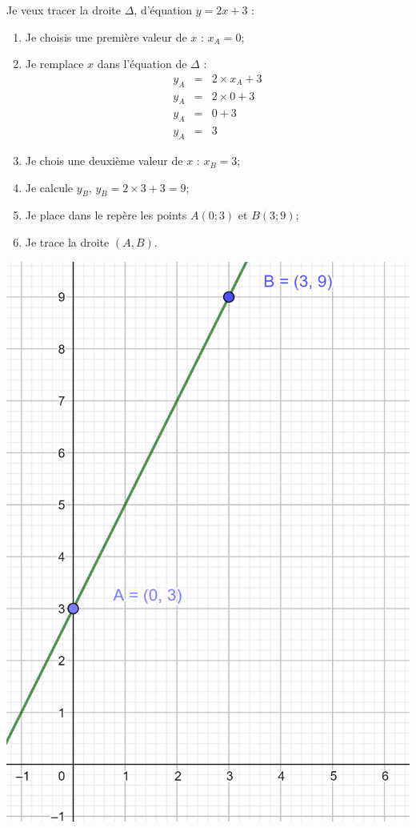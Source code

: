 \documentclass[12pt,a4paper]{article}
\begin{document}
Je veux tracer la droite $\Delta$, d'équation $ y = 2x + 3$ :
\begin{multicols}{2}
	
\begin{enumerate}
	\item Je choisis une première valeur de $x$ : $x_A = 0$;
	\item Je remplace $x$ dans l'équation de $\Delta$ :
		\begin{eqnarray*}
			y_A &=& 2 \times x_A + 3 \\
			y_A &=& 2 \times 0 + 3 \\
			y_A &=& 0 + 3 \\
			y_A &=& 3
		\end{eqnarray*} 
	\item Je chois une deuxième valeur de $x$ : $x_B = 3$;
	\item Je calcule $y_B$, $y_B = 2 \times 3 + 3 = 9$;
	\item Je place dans le repère les points $A(0;3)$ et $B(3;9)$;
	\item Je trace la droite $(A,B)$.
\end{enumerate}

\begin{center}
	\includegraphics[scale=0.3]{img/trace_droite}
\end{center}
\end{multicols}
\end{document}
